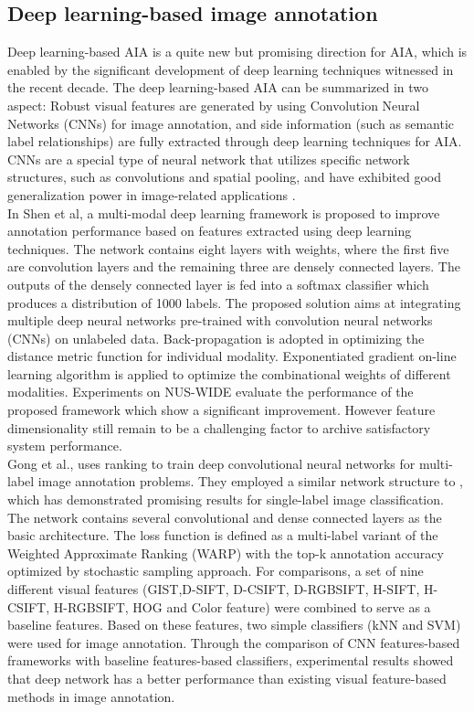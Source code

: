 \documentclass[conference]{IEEEtran}
\begin{document}
	\subsection{Deep learning-based image annotation}

		Deep learning-based AIA is a quite new but promising direction for AIA, which is enabled by the significant development of deep learning techniques witnessed in the recent decade. The deep learning-based AIA can be summarized in two aspect: Robust visual features are
generated by using Convolution Neural Networks (CNNs) for image annotation, and side information (such as semantic label relationships) are fully extracted through deep learning techniques for AIA. CNNs are a special type of neural network that utilizes specific network structures, such as convolutions and spatial pooling, and have exhibited good generalization power in image-related applications \cite{Shin, Simonyan, Kalita}.\\
		
		In Shen et al\cite{Zhu}, a multi-modal deep learning framework is proposed to improve annotation performance based on features extracted using deep learning techniques. The network contains eight layers with weights, where the first five are convolution layers and the
remaining three are densely connected layers. The outputs of the densely connected layer is fed into a softmax classifier which produces a distribution of 1000 labels. The proposed
		solution aims at integrating multiple deep neural networks pre-trained with convolution
 neural networks (CNNs) on unlabeled data. Back-propagation is adopted in optimizing the distance metric function for individual modality. Exponentiated gradient on-line learning
algorithm\cite{kivinen} is applied to optimize the combinational weights of different modalities.
Experiments on NUS-WIDE evaluate the performance of the proposed framework which
show a significant improvement. However feature dimensionality still remain to be a
challenging factor to archive satisfactory system performance.\\
		
		Gong et al.\cite{Gong}, uses ranking to train deep convolutional neural networks for multi-label image annotation problems. They employed a similar network structure to \cite{Hinton},
which has demonstrated promising results for single-label image classification. The network
contains several convolutional and dense connected layers as the basic architecture. The
loss function is defined as a multi-label variant of the Weighted Approximate Ranking
(WARP) with the top-k annotation accuracy optimized by stochastic sampling approach.
For comparisons, a set of nine different visual features (GIST,D-SIFT, D-CSIFT,
D-RGBSIFT, H-SIFT, H-CSIFT, H-RGBSIFT, HOG and Color feature) were
		combined to serve as a baseline features. Based on these features, two simple classifiers (kNN
and SVM) were used for image annotation. Through the comparison of CNN features-based
frameworks with baseline features-based classifiers, experimental results showed that deep
network has a better performance than existing visual feature-based methods in image
annotation.\\
		
\end{document}
